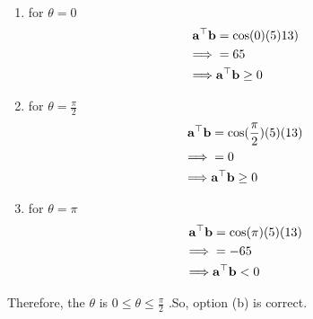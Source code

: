 \documentclass[10pt]{article}
\let\vec\mathbf{}
\begin{document}
\begin{enumerate}
\begin{align}
\end{align}
\begin{enumerate}
\item for $\theta=0$
\begin{align}
{\vec{a}}^{\top}{\vec{b}}&=\cos(0)(5)13)\\
\implies &=65\\
\implies &{\vec{a}}^{\top}{\vec{b}}\ge0 \notag
\end{align}
\item for $\theta=\frac{\pi}{2}$
\begin{align}
{\vec{a}}^{\top}{\vec{b}}&=\cos(\frac{\pi}{2})(5)(13) \\
\implies &=0\\
\implies &{\vec{a}}^{\top}{\vec{b}}\ge0 \notag
\end{align}
\item for $\theta=\pi$ 
\begin{align}
{\vec{a}}^{\top}{\vec{b}}&=\cos(\pi)(5)(13)\\
\implies &=-65\\
\implies &{\vec{a}}^{\top}{\vec{b}}<0 \notag
\end{align}
\end{enumerate}
Therefore, the $\theta$ is $0\le\theta\le\frac{\pi}{2}$ .So, option (b) is correct.
\end{enumerate}
\end{document}
